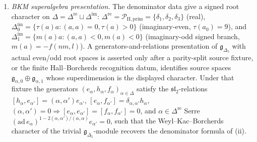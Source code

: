 \begin{lemma}
\begin{enumerate}[label=\textup{(\roman*)},leftmargin=1.5em]
\item \emph{BKM superalgebra presentation.} The denominator data give a signed root character on $\Delta = \Delta^{\mathrm{re}}\sqcup\Delta^{\mathrm{im}}$: $\Delta^{\mathrm{re}} = \mathcal P_{\mathrm{II,prim}} = \{\delta_1,\delta_2,\delta_3\}$ \textup{(}real\textup{)}, $\Delta_0^{\mathrm{im}} = \{\tau(a)a : (a,a)=0,\tau(a)>0\}$ \textup{(}imaginary-even, $\tau(a_0)=9$\textup{)}, and $\Delta_1^{\mathrm{im}} = \{m(a)a : (a,a)<0,m(a)<0\}$ \textup{(}imaginary-odd signed branch, $m(a)=-f(nm,l)$\textup{)}. A generators-and-relations presentation of $\mathfrak g_{\Delta_5}$ with actual even/odd root spaces is asserted only after a parity-split source fixture, or the finite Hall--Borcherds recognition datum, identifies source spaces $\mathfrak g_{\alpha,0}\oplus\mathfrak g_{\alpha,1}$ whose superdimension is the displayed character. Under that fixture the generators $(e_\alpha, h_\alpha, f_\alpha)_{\alpha\in\Delta}$ satisfy the $\mathfrak{sl}_2$-relations $[h_\alpha, e_{\alpha'}] = (\alpha,\alpha')e_{\alpha'}$, $[e_\alpha, f_{\alpha'}] = \delta_{\alpha,\alpha'} h_\alpha$, $(\alpha,\alpha')=0\Rightarrow[e_\alpha,e_{\alpha'}]=[f_\alpha,f_{\alpha'}]=0$, and $\alpha\in\Delta^{\mathrm{re}}$ Serre $(\mathrm{ad}\,e_\alpha)^{1-2(\alpha,\alpha')/(\alpha,\alpha)}e_{\alpha'} = 0$, such that the Weyl--Kac--Borcherds character of the trivial $\mathfrak g_{\Delta_5}$-module recovers the denominator formula of (ii).
\end{enumerate}
\end{lemma}

